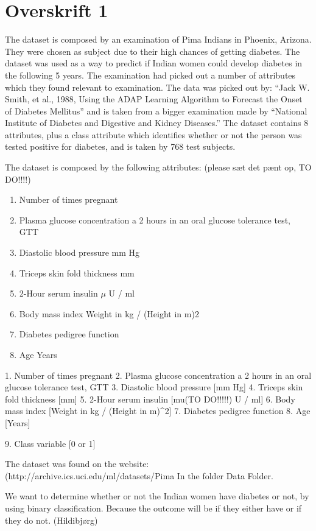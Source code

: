 \section{Overskrift 1}

The dataset is composed by an examination of Pima Indians in Phoenix, Arizona.
They were chosen as subject due to their high chances of getting diabetes.
The dataset was used as a way to predict if Indian women could develop diabetes in the following 5 years.
The examination had picked out a number of attributes which they found relevant to examination.
The data was picked out by: “Jack W. Smith, et al., 1988, Using the ADAP Learning Algorithm to Forecast the Onset of Diabetes Mellitus”
and is taken from a bigger examination made by “National Institute of Diabetes and Digestive and Kidney Diseases.”
The dataset contains 8 attributes, plus a class attribute which identifies whether or not the person was tested positive for diabetes, and is taken by 768 test subjects.

The dataset is composed by the following attributes:
(please sæt det pænt op, TO DO!!!!)
\begin{enumerate}
\item Number of times pregnant
\item Plasma glucose concentration a 2 hours in an oral glucose tolerance test, GTT
\item Diastolic blood pressure mm Hg
\item Triceps skin fold thickness mm
\item 2-Hour serum insulin $\mu$ U / ml
\item Body mass index Weight in kg / (Height in m)2
\item Diabetes pedigree function
\item Age Years
\end{enumerate}

1. Number of times pregnant
2. Plasma glucose concentration a 2 hours in an oral glucose tolerance test, GTT
3. Diastolic blood pressure [mm Hg]
4. Triceps skin fold thickness [mm]
5. 2-Hour serum insulin [mu(TO DO!!!!!) U / ml]
6. Body mass index [Weight in kg / (Height in m)^2]
7. Diabetes pedigree function
8. Age [Years]

9. Class variable [0 or 1]

The dataset was found on the website: (http://archive.ics.uci.edu/ml/datasets/Pima%
In the folder Data Folder.

We want to determine whether or not the Indian women have diabetes or not, by using binary classification.
Because the outcome will be if they either have or if they do not.
(Hildibjørg)

